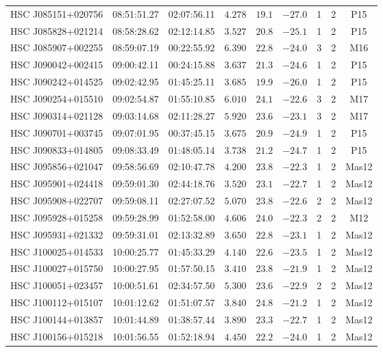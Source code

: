 \documentclass[]{pasj01}
\begin{document}
{\begin{longtable}{ccccccccc}
HSC J085151+020756 & 08:51:51.27 & 02:07:56.11 & $4.278$ & $19.1$ & $-27.0$ & 1 & 2 & P15 \\
HSC J085828+021214 & 08:58:28.62 & 02:12:14.85 & $3.527$ & $20.8$ & $-25.1$ & 1 & 2 & P15 \\
HSC J085907+002255 & 08:59:07.19 & 00:22:55.92 & $6.390$ & $22.8$ & $-24.0$ & 3 & 2 & M16 \\
HSC J090042+002415 & 09:00:42.11 & 00:24:15.88 & $3.637$ & $21.3$ & $-24.6$ & 1 & 2 & P15 \\
HSC J090242+014525 & 09:02:42.95 & 01:45:25.11 & $3.685$ & $19.9$ & $-26.0$ & 1 & 2 & P15 \\
HSC J090254+015510 & 09:02:54.87 & 01:55:10.85 & $6.010$ & $24.1$ & $-22.6$ & 3 & 2 & M17 \\
HSC J090314+021128 & 09:03:14.68 & 02:11:28.27 & $5.920$ & $23.6$ & $-23.1$ & 3 & 2 & M17 \\
HSC J090701+003745 & 09:07:01.95 & 00:37:45.15 & $3.675$ & $20.9$ & $-24.9$ & 1 & 2 & P15 \\
HSC J090833+014805 & 09:08:33.49 & 01:48:05.14 & $3.738$ & $21.2$ & $-24.7$ & 1 & 2 & P15 \\
HSC J095856+021047 & 09:58:56.69 & 02:10:47.78 & $4.200$ & $23.8$ & $-22.3$ & 1 & 2 & Mas12 \\
HSC J095901+024418 & 09:59:01.30 & 02:44:18.76 & $3.520$ & $23.1$ & $-22.7$ & 1 & 2 & Mas12 \\
HSC J095908+022707 & 09:59:08.11 & 02:27:07.52 & $5.070$ & $23.8$ & $-22.6$ & 2 & 2 & Mas12 \\
HSC J095928+015258 & 09:59:28.99 & 01:52:58.00 & $4.606$ & $24.0$ & $-22.3$ & 2 & 2 & M12 \\
HSC J095931+021332 & 09:59:31.01 & 02:13:32.89 & $3.650$ & $22.8$ & $-23.1$ & 1 & 2 & Mas12 \\
HSC J100025+014533 & 10:00:25.77 & 01:45:33.29 & $4.140$ & $22.6$ & $-23.5$ & 1 & 2 & Mas12 \\
HSC J100027+015750 & 10:00:27.95 & 01:57:50.15 & $3.410$ & $23.8$ & $-21.9$ & 1 & 2 & Mas12 \\
HSC J100051+023457 & 10:00:51.61 & 02:34:57.50 & $5.300$ & $23.6$ & $-22.9$ & 2 & 2 & Mas12 \\
HSC J100112+015107 & 10:01:12.62 & 01:51:07.57 & $3.840$ & $24.8$ & $-21.2$ & 1 & 2 & Mas12 \\
HSC J100144+013857 & 10:01:44.89 & 01:38:57.44 & $3.890$ & $23.3$ & $-22.7$ & 1 & 2 & Mas12 \\
HSC J100156+015218 & 10:01:56.55 & 01:52:18.94 & $4.450$ & $22.2$ & $-24.0$ & 1 & 2 & Mas12 \\

\end{longtable}}
\end{document}
